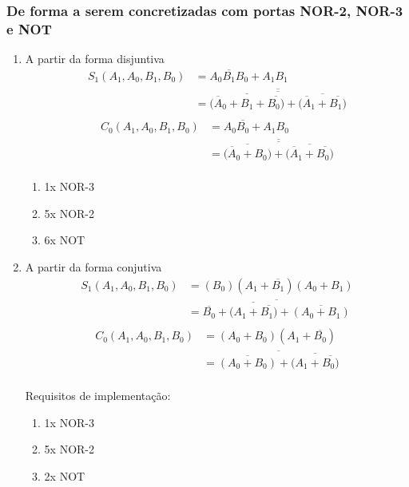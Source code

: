\documentclass[a4paper,12pt]{article}
\begin{document}
\subsubsection{De forma a serem concretizadas com portas NOR-2, NOR-3 e NOT}
\begin{enumerate}
\item A partir da forma disjuntiva
\begin{equation}
\begin{split}
S_1(A_1,A_0,B_1,B_0) & = A_0\overline{B_1}B_0 + A_1B_1 \\
                     & = \overline{\overline{\overline{\overline{(A_0} + B_1 + 
                         \overline{B_0)}}+\overline{\overline{(A_1} + \overline{B_1)}}}}  \\   
\end{split}
\end{equation}
\begin{equation}
\begin{split}
C_0(A_1,A_0,B_1,B_0) & = A_0\overline{B_0} + A_1B_0 \\
                     & = \overline{\overline{\overline{\overline{(A_0} + B_0)} 
                         + \overline{\overline{(A_1} + \overline{B_0)}}}}  \\   
\end{split}
\end{equation}
\begin{enumerate}
    \item 1x NOR-3
    \item 5x NOR-2
    \item 6x NOT
  \end{enumerate}

\par
\item A partir da forma conjutiva
\begin{equation}
\begin{split}
S_1(A_1,A_0,B_1,B_0) & = (B_0)(A_1+\overline{B_1})(A_0+B_1) \\
                     & = \overline{\overline{B_0}+\overline{(A_1+\overline{B_1)}}
                         +\overline{(A_0+B_1)}}\\
\end{split}
\end{equation}
\begin{equation}
\begin{split}
C_0(A_1,A_0,B_1,B_0) & = (A_0+B_0)(A_1+\overline{B_0}) \\
                     & = \overline{\overline{(A_0+B_0)}+\overline{(A_1+\overline{B_0)}}}\\
\end{split}
\end{equation}

Requisitos de implementação:
\begin{enumerate}
    \item 1x NOR-3
    \item 5x NOR-2
    \item 2x NOT
  \end{enumerate}
\end{enumerate}
\end{document}
